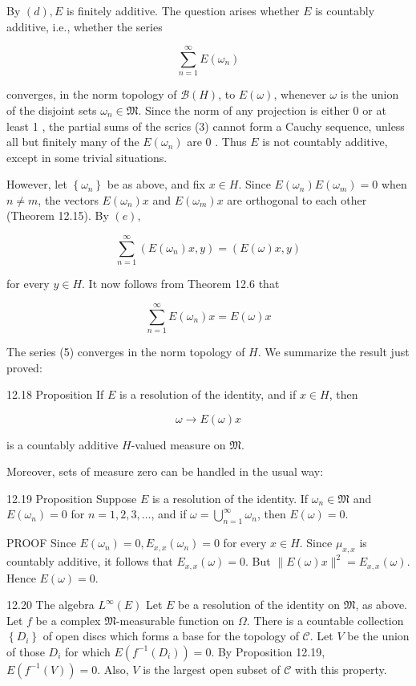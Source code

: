 \documentclass[10pt]{article}
\begin{document}
By $(d), E$ is finitely additive. The question arises whether $E$ is countably additive, i.e., whether the series

$$
\sum_{n=1}^{\infty} E\left(\omega_{n}\right)
$$

converges, in the norm topology of $\mathscr{B}(H)$, to $E(\omega)$, whenever $\omega$ is the union of the disjoint sets $\omega_{n} \in \mathfrak{M}$. Since the norm of any projection is either 0 or at least 1 , the partial sums of the scrics (3) cannot form a Cauchy sequence, unless all but finitely many of the $E\left(\omega_{n}\right)$ are 0 . Thus $E$ is not countably additive, except in some trivial situations.

However, let $\left\{\omega_{n}\right\}$ be as above, and fix $x \in H$. Since $E\left(\omega_{n}\right) E\left(\omega_{m}\right)=0$ when $n \neq m$, the vectors $E\left(\omega_{n}\right) x$ and $E\left(\omega_{m}\right) x$ are orthogonal to each other (Theorem 12.15). By $(e)$,

$$
\sum_{n=1}^{\infty}\left(E\left(\omega_{n}\right) x, y\right)=(E(\omega) x, y)
$$

for every $y \in H$. It now follows from Theorem 12.6 that

$$
\sum_{n=1}^{\infty} E\left(\omega_{n}\right) x=E(\omega) x
$$

The series (5) converges in the norm topology of $H$. We summarize the result just proved:

12.18 Proposition If $E$ is a resolution of the identity, and if $x \in H$, then

$$
\omega \rightarrow E(\omega) x
$$

is a countably additive $H$-valued measure on $\mathfrak{M}$.

Moreover, sets of measure zero can be handled in the usual way:

12.19 Proposition Suppose $E$ is a resolution of the identity. If $\omega_{n} \in \mathfrak{M}$ and $E\left(\omega_{n}\right)=0$ for $n=1,2,3, \ldots$, and if $\omega=\bigcup_{n=1}^{\infty} \omega_{n}$, then $E(\omega)=0$.

PROOF Since $E\left(\omega_{n}\right)=0, E_{x, x}\left(\omega_{n}\right)=0$ for every $x \in H$. Since $\mu_{x, x}$ is countably additive, it follows that $E_{x, x}(\omega)=0$. But $\|E(\omega) x\|^{2}=E_{x, x}(\omega)$. Hence $E(\omega)=0$.

12.20 The algebra $L^{\infty}(E)$ Let $E$ be a resolution of the identity on $\mathfrak{M}$, as above. Let $f$ be a complex $\mathfrak{M}$-measurable function on $\Omega$. There is a countable collection $\left\{D_{i}\right\}$ of open discs which forms a base for the topology of $\mathscr{C}$. Let $V$ be the union of those $D_{i}$ for which $E\left(f^{-1}\left(D_{i}\right)\right)=0$. By Proposition 12.19, $E\left(f^{-1}(V)\right)=0$. Also, $V$ is the largest open subset of $\mathscr{C}$ with this property.
\end{document}
